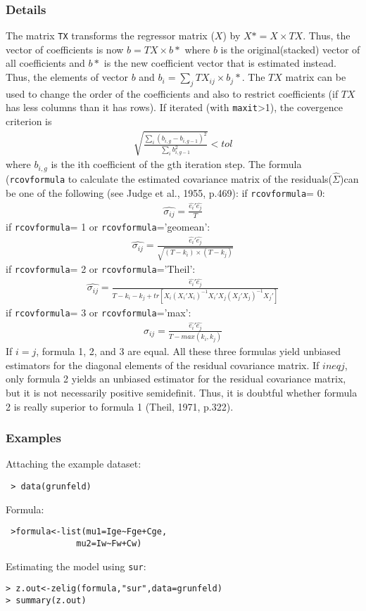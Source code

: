 \subsubsection{Details}
The matrix \texttt{TX} transforms the regressor matrix ($X$) by $X\ast=X \times TX$. Thus,
the vector of coefficients is now $b=TX \times b\ast$ where $b$ is the original(stacked) 
vector of all coefficients and $b\ast$ is the new coefficient vector that is estimated instead.
Thus, the elements of vector $b$ and $b_i = \sum_j TX_{ij}\times b_j\ast$. The $TX$ matrix can be
used to change the order of the coefficients and also to restrict coefficients (if $TX$ has 
less columns than it has rows). 
If iterated (with \texttt{maxit}>1), the covergence criterion is
\begin{eqnarray*}
\sqrt{\frac{\sum_i(b_{i,g}-b_{i,g-1})^2}{\sum_ib_{i,g-1}^2}}< tol
\end{eqnarray*}
where $b_{i,g}$ is the ith coefficient of the gth iteration step.
The formula (\texttt{rcovformula} to calculate the estimated covariance matrix of the residuals($\hat{\Sigma}$)can be one
of the following (see Judge et al., 1955, p.469):
if \texttt{rcovformula}= 0:
\begin{eqnarray*}
\hat{\sigma_{ij}}= \frac{\hat{e_i}\prime\hat{e_j}}{T}
\end{eqnarray*}
if \texttt{rcovformula}= 1 or \texttt{rcovformula}='geomean':
\begin{eqnarray*}
\hat{\sigma_{ij}}= \frac{\hat{e_i}\prime\hat{e_j}}{\sqrt{(T-k_i)\times (T-k_j)}}
\end{eqnarray*}
if \texttt{rcovformula}= 2 or \texttt{rcovformula}='Theil':
\begin{eqnarray*}
\hat{\sigma_{ij}}= \frac{\hat{e_i}\prime\hat{e_j}}{T-k_i-k_j+tr[X_i(X_i\prime X_i)^{-1}X_i\prime X_j(X_j\prime X_j)^{-1}X_j\prime]}
\end{eqnarray*}
if \texttt{rcovformula}= 3 or \texttt{rcovformula}='max':
\begin{eqnarray*}
\hat{\sigma_{ij}}= \frac{\hat{e_i}\prime\hat{e_j}}{T-max(k_i,k_j)}
\end{eqnarray*}
If $i = j$, formula 1, 2, and 3 are equal. All these three formulas yield unbiased estimators
for the diagonal elements of the residual covariance matrix. If $i neq j$, only formula 2
yields an unbiased estimator for the residual covariance matrix, but it is not necessarily
positive semidefinit. Thus, it is doubtful whether formula 2 is really superior to formula 1
(Theil, 1971, p.322).
\subsubsection{Examples}
 Attaching the example dataset:
 \begin{verbatim} 
 > data(grunfeld)
 \end{verbatim}
 Formula:
\begin{verbatim}
 >formula<-list(mu1=Ige~Fge+Cge,
              mu2=Iw~Fw+Cw)
\end{verbatim}
Estimating the model using \texttt{sur}:
\begin{verbatim}
> z.out<-zelig(formula,"sur",data=grunfeld)
> summary(z.out)
\end{verbatim}

